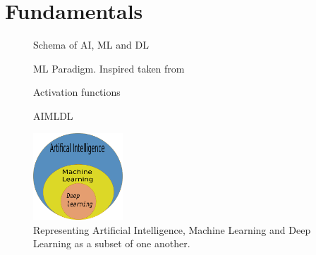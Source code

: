 \chapter{Fundamentals}

\begin{figure}[h]
	\centering
    \def\svgwidth{0.5\textwidth}
%    
    \caption{Schema of AI, ML and DL}
    \label{fig:ai_ml_dl}
\end{figure}


\begin{figure}[h]
	\centering
    \def\svgwidth{0.5\textwidth}
%    
    \caption{ML Paradigm. Inspired taken from \cite{mlparadigm}}
    \label{fig:mlparadigm}
\end{figure}



\begin{figure}[h]
	\begin{center}
	   \def\svgwidth{0.7\textwidth}
%    
	\end{center}
    \caption{Activation functions}
    \label{fig:activationfunctions}
\end{figure}

\begin{figure}[h]
	\begin{center}
	   \def\svgwidth{0.7\textwidth}
%    
	\end{center}
    \caption{AIMLDL}
    \label{fig:Sensors}
\end{figure}
\begin{figure}[h]
    \begin{center}
        \includegraphics[width =0.3\textwidth]{figures/inkscape/aimldl.png}
    \end{center}
    \caption{Representing Artificial Intelligence, Machine Learning and Deep Learning as a
    subset of one another.}
    \label{fig:ai_ml_dl}
\end{figure}


